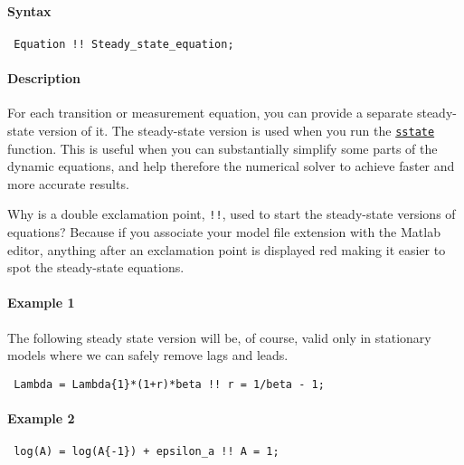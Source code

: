 


	\paragraph{Syntax}
 
 \begin{verbatim}
 Equation !! Steady_state_equation;
 \end{verbatim}
 
 \paragraph{Description}
 
 For each transition or measurement equation, you can provide a separate
 steady-state version of it. The steady-state version is used when you
 run the \href{model/sstate}{\texttt{sstate}} function. This is useful
 when you can substantially simplify some parts of the dynamic equations,
 and help therefore the numerical solver to achieve faster and more
 accurate results.
 
 Why is a double exclamation point, \texttt{!!}, used to start the
 steady-state versions of equations? Because if you associate your model
 file extension with the Matlab editor, anything after an exclamation
 point is displayed red making it easier to spot the steady-state
 equations.
 
 \paragraph{Example 1}
 
 The following steady state version will be, of course, valid only in
 stationary models where we can safely remove lags and leads.
 
 \begin{verbatim}
 Lambda = Lambda{1}*(1+r)*beta !! r = 1/beta - 1;
 \end{verbatim}
 
 \paragraph{Example 2}
 
 \begin{verbatim}
 log(A) = log(A{-1}) + epsilon_a !! A = 1;
 \end{verbatim}


